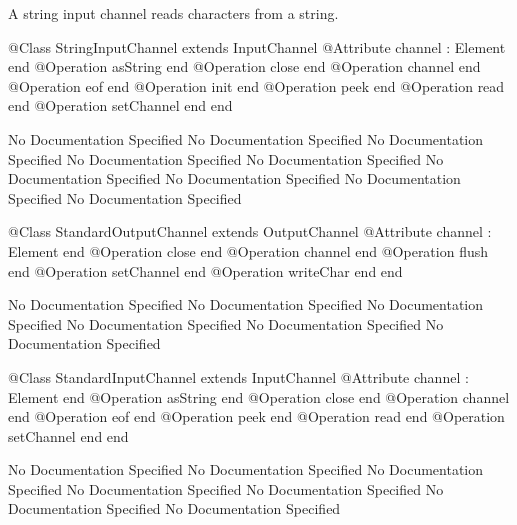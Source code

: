       A string input channel reads characters from a string.
\begin{Interface}
@Class StringInputChannel extends InputChannel
  @Attribute channel : Element end
  @Operation asString end
  @Operation close end
  @Operation channel end
  @Operation eof end
  @Operation init end
  @Operation peek end
  @Operation read end
  @Operation setChannel end
end
\end{Interface}
No Documentation Specified
No Documentation Specified
No Documentation Specified
No Documentation Specified
No Documentation Specified
No Documentation Specified
No Documentation Specified
No Documentation Specified
No Documentation Specified
\begin{Interface}
@Class StandardOutputChannel extends OutputChannel
  @Attribute channel : Element end
  @Operation close end
  @Operation channel end
  @Operation flush end
  @Operation setChannel end
  @Operation writeChar end
end
\end{Interface}
No Documentation Specified
No Documentation Specified
No Documentation Specified
No Documentation Specified
No Documentation Specified
No Documentation Specified
\begin{Interface}
@Class StandardInputChannel extends InputChannel
  @Attribute channel : Element end
  @Operation asString end
  @Operation close end
  @Operation channel end
  @Operation eof end
  @Operation peek end
  @Operation read end
  @Operation setChannel end
end
\end{Interface}
No Documentation Specified
No Documentation Specified
No Documentation Specified
No Documentation Specified
No Documentation Specified
No Documentation Specified
No Documentation Specified

